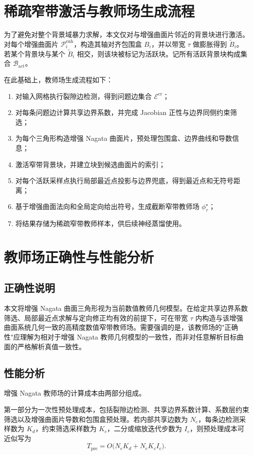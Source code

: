 \documentclass[12pt,oneside]{ctexbook}
\begin{document}
\section{稀疏窄带激活与教师场生成流程}
为了避免对整个背景域暴力求解，本文仅对与增强曲面片邻近的背景块进行激活。对每个增强曲面片 $\mathcal P_i^{\mathrm{enh}}$，构造其轴对齐包围盒 $B_i$，并以带宽 $\tau$ 做膨胀得到 $\widetilde B_i$。若某个背景块与某个 $\widetilde B_i$ 相交，则该块被标记为活跃块。记所有活跃背景块构成集合 $\mathcal B_{\mathrm{act}}$。

在此基础上，教师场生成流程如下：
\begin{enumerate}[label=\arabic*)]
  \item 对输入网格执行裂隙边检测，得到问题边集合 $\mathcal E^{\mathrm{cr}}$；
  \item 对每条问题边计算共享边界系数，并完成 Jacobian 正性与边界同侧约束筛选；
  \item 为每个三角形构造增强 Nagata 曲面片，预处理包围盒、边界曲线和导数信息；
  \item 激活窄带背景块，并建立块到候选曲面片的索引；
  \item 对每个活跃采样点执行局部最近点投影与边界兜底，得到最近点和无符号距离；
  \item 基于增强曲面法向和全局定向给出符号，生成截断窄带教师场 $\phi^\star_\tau$；
  \item 将结果存储为稀疏窄带教师样本，供后续神经蒸馏使用。
\end{enumerate}

\section{教师场正确性与性能分析}
\subsection{正确性说明}
本文将增强 Nagata 曲面三角形视为当前数值教师几何模型。在给定共享边界系数筛选、局部最近点求解与定向修正均有效的前提下，可在带宽 $\tau$ 内构造与该增强曲面系统几何一致的高精度数值窄带教师场。需要强调的是，该教师场的"正确性"应理解为相对于增强 Nagata 教师几何模型的一致性，而非对任意解析目标曲面的严格解析真值一致性。

\subsection{性能分析}
增强 Nagata 教师场的计算成本由两部分组成。

第一部分为一次性预处理成本，包括裂隙边检测、共享边界系数计算、系数层约束筛选以及增强曲面片导数和包围盒预处理。若内部共享边数为 $N_e$，每条边检测采样数为 $K_d$，约束筛选采样数为 $K_c$，二分或缩放迭代步数为 $I_c$，则预处理成本可近似写为
\[
T_{\mathrm{pre}}=O\big(N_eK_d+N_eK_cI_c\big).
\]
\end{document}
